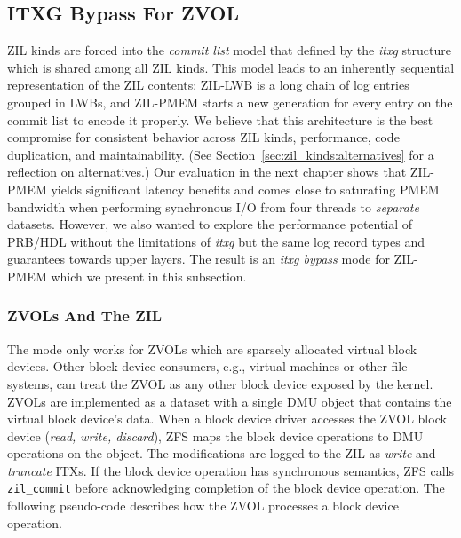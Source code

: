 \documentclass[12pt,a4paper,twoside]{book}
\begin{document}
\subsection{ITXG Bypass For ZVOL}\label{sec:itxgbypass}
ZIL kinds are forced into the \textit{commit list} model that defined by the \textit{itxg} structure which is shared among all ZIL kinds.
This model leads to an inherently sequential representation of the ZIL contents:
ZIL-LWB is a long chain of log entries grouped in LWBs, and ZIL-PMEM starts a new generation for every entry on the commit list to encode it properly.
We believe that this architecture is the best compromise for consistent behavior across ZIL kinds, performance, code duplication, and maintainability.
(See Section~\ref{sec:zil_kinds:alternatives} for a reflection on alternatives.)
Our evaluation in the next chapter shows that ZIL-PMEM yields significant latency benefits and comes close to saturating PMEM bandwidth when performing synchronous I/O from four threads to \textit{separate} datasets.
However, we also wanted to explore the performance potential of PRB/HDL without the limitations of \textit{itxg} but the same log record types and guarantees towards upper layers.
The result is an \textit{itxg bypass} mode for ZIL-PMEM which we present in this subsection.

\subsubsection{ZVOLs And The ZIL}\label{sec:itxgbypass:openzfsbackground_zvols}
The mode only works for ZVOLs which are sparsely allocated virtual block devices.
Other block device consumers, e.g., virtual machines or other file systems, can treat the ZVOL as any other block device exposed by the kernel.
ZVOLs are implemented as a dataset with a single DMU object that contains the virtual block device's data.
When a block device driver accesses the ZVOL block device (\textit{read, write, discard}), ZFS maps the block device operations to DMU operations on the object.
The modifications are logged to the ZIL as \textit{write} and \textit{truncate} ITXs.
If the block device operation has synchronous semantics, ZFS calls \lstinline{zil_commit} before acknowledging completion of the block device operation.
The following pseudo-code describes how the ZVOL processes a block device operation.
\end{document}
